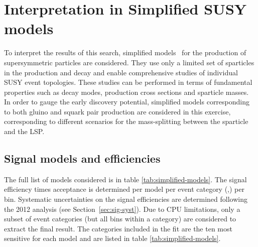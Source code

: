 \section{Interpretation in Simplified SUSY models}
\label{sec:susy}
To interpret the results of this search, simplified
models~\cite{Alwall:2008ag,Alwall:2008va,Alves:2011wf} for the production of supersymmetric particles are considered. 
They use only a limited set of sparticles in the production and
decay and enable comprehensive studies of individual SUSY event
topologies. These studies can be performed in terms of
fundamental properties such as decay modes, production cross sections and sparticle masses. 
In order to gauge the early discovery potential, simplified models corresponding to both gluino and squark pair production 
are considered in this exercise, corresponding to different scenarios for the mass-splitting between the sparticle and the LSP. 

\subsection{Signal models and efficiencies}
\label{subsec:susy_models}

The full list of models considered is in table \ref{tab:simplified-models}. 
The signal efficiency times acceptance is determined per model per event
category (\njet,\nb) per \HT bin. 
Systematic uncertainties on the signal efficiencies are determined 
following the 2012 analysis (see Section~\ref{sec:sig-syst}). Due to CPU
limitations, only a subset of event categories (but all \scalht bins
within a category) are considered to extract the final result. 
The categories included in the fit are the ten most sensitive 
for each model and are listed in table \ref{tab:simplified-models}. 

